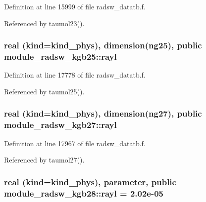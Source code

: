 Definition at line 15999 of file radsw\+\_\+datatb.\+f.



Referenced by taumol23().

\subsubsection[{\texorpdfstring{rayl}{rayl}}]{\setlength{\rightskip}{0pt plus 5cm}real (kind=kind\+\_\+phys), dimension(ng25), public module\+\_\+radsw\+\_\+kgb25\+::rayl}\hypertarget{group__module__radsw__main_ga3d32a0d74d03129cacd9c4bb2e58683a}{}\label{group__module__radsw__main_ga3d32a0d74d03129cacd9c4bb2e58683a}


Definition at line 17778 of file radsw\+\_\+datatb.\+f.



Referenced by taumol25().

\subsubsection[{\texorpdfstring{rayl}{rayl}}]{\setlength{\rightskip}{0pt plus 5cm}real (kind=kind\+\_\+phys), dimension(ng27), public module\+\_\+radsw\+\_\+kgb27\+::rayl}\hypertarget{group__module__radsw__main_gaca4c6e06d1cd46568048a035c6726f1d}{}\label{group__module__radsw__main_gaca4c6e06d1cd46568048a035c6726f1d}


Definition at line 17967 of file radsw\+\_\+datatb.\+f.



Referenced by taumol27().

\subsubsection[{\texorpdfstring{rayl}{rayl}}]{\setlength{\rightskip}{0pt plus 5cm}real (kind=kind\+\_\+phys), parameter, public module\+\_\+radsw\+\_\+kgb28\+::rayl = 2.\+02e-\/05}\hypertarget{group__module__radsw__main_gaf3641febf88e97741b2cd86a56eda843}{}\label{group__module__radsw__main_gaf3641febf88e97741b2cd86a56eda843}


